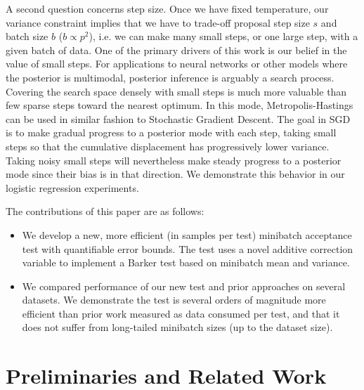 \documentclass[twoside]{article} \usepackage{aistats2017}
\begin{document}
A second question concerns step size. Once we have fixed temperature,
our variance constraint implies that we have to trade-off proposal
step size $s$ and batch size $b$ ($b \propto p^2$), i.e. we can make
many small steps, or one large step, with a given batch of data. One
of the primary drivers of this work is our belief in the value of
small steps. For applications to neural networks or other models where
the posterior is multimodal, posterior inference is arguably a search
process. Covering the search space densely with small steps is much
more valuable than few sparse steps toward the nearest optimum. In
this mode, Metropolis-Hastings can be used in similar fashion to
Stochastic Gradient Descent. The goal in SGD is to make gradual
progress to a posterior mode with each step, taking small steps so
that the cumulative displacement has progressively lower variance. %
Taking noisy small steps will nevertheless make steady progress to 
a posterior mode since their bias is in that direction. We demonstrate 
this behavior in our logistic regression experiments. 

The contributions of this paper are as follows:
\begin{itemize}[noitemsep]
\item We develop a new, more efficient (in samples per test) minibatch acceptance test with quantifiable error bounds. The test
  uses a novel additive correction variable to implement a Barker test based on minibatch mean and variance. 
\item We compared performance of our new test and prior approaches on several datasets. We demonstrate the test is several orders
  of magnitude more efficient than prior work measured as data consumed per test, and that it does not suffer
  from long-tailed minibatch sizes (up to the dataset size). 
\end{itemize}



\section{Preliminaries and Related Work}\label{sec:related_work}
\end{document}
